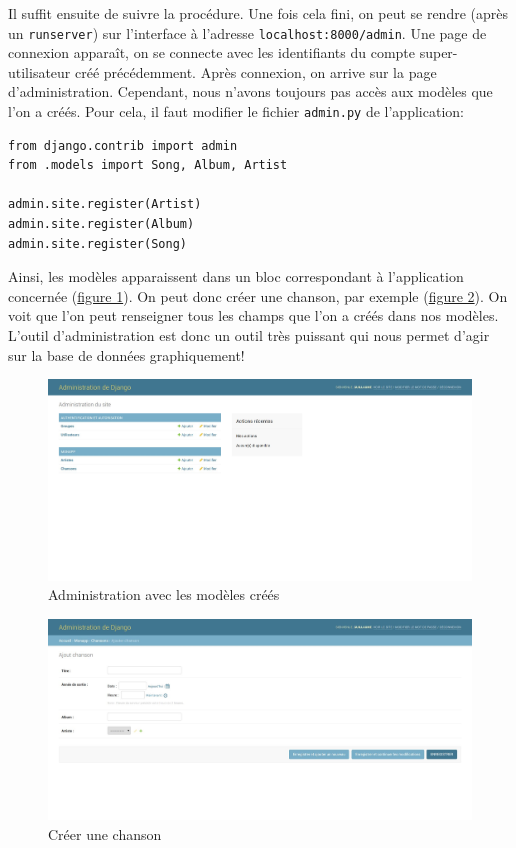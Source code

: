 \documentclass[a4paper, 10pt]{article}
\begin{document}
Il suffit ensuite de suivre la procédure. Une fois cela fini, on peut se rendre (après un \texttt{runserver}) sur l'interface à l'adresse \texttt{localhost:8000/admin}. Une page de connexion apparaît, on se connecte avec les identifiants du compte super-utilisateur créé précédemment. Après connexion, on arrive sur la page d'administration. Cependant, nous n'avons toujours pas accès aux modèles que l'on a créés. Pour cela, il faut modifier le fichier \texttt{admin.py} de l'application:
\begin{verbatim}
from django.contrib import admin
from .models import Song, Album, Artist

admin.site.register(Artist)
admin.site.register(Album)
admin.site.register(Song)
\end{verbatim}
Ainsi, les modèles apparaissent dans un bloc correspondant à l'application concernée (\hyperref[admin2]{figure 1}). On peut donc créer une chanson, par exemple (\hyperref[admin3]{figure 2}). On voit que l'on peut renseigner tous les champs que l'on a créés dans nos modèles. L'outil d’administration est donc un outil très puissant qui nous permet d'agir sur la base de données graphiquement!
\begin{figure}[h]
    \begin{center}
        \includegraphics[width=15 cm]{django/admin2.jpg}
        \caption{Administration avec les modèles créés}\label{admin2}
    \end{center}
\end{figure}
\begin{figure}[h]
    \begin{center}
        \includegraphics[width=15 cm]{django/admin3.jpg}
        \caption{Créer une chanson}\label{admin3}
    \end{center}
\end{figure}
\end{document}
